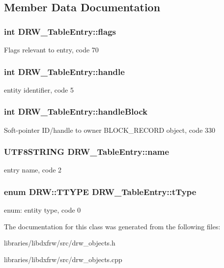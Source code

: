 \subsection{Member Data Documentation}
\hypertarget{classDRW__TableEntry_a45931e761e264e52857687067029e6a8}{
\subsubsection[{flags}]{\setlength{\rightskip}{0pt plus 5cm}int D\-R\-W\-\_\-\-Table\-Entry\-::flags}}\label{classDRW__TableEntry_a45931e761e264e52857687067029e6a8}
Flags relevant to entry, code 70 \hypertarget{classDRW__TableEntry_a9aefd859bd8a3d423f53623f8f089ac3}{
\subsubsection[{handle}]{\setlength{\rightskip}{0pt plus 5cm}int D\-R\-W\-\_\-\-Table\-Entry\-::handle}}\label{classDRW__TableEntry_a9aefd859bd8a3d423f53623f8f089ac3}
entity identifier, code 5 \hypertarget{classDRW__TableEntry_a91713970d0eec5baf8aa16b8c5556ce7}{
\subsubsection[{handle\-Block}]{\setlength{\rightskip}{0pt plus 5cm}int D\-R\-W\-\_\-\-Table\-Entry\-::handle\-Block}}\label{classDRW__TableEntry_a91713970d0eec5baf8aa16b8c5556ce7}
Soft-\/pointer I\-D/handle to owner B\-L\-O\-C\-K\-\_\-\-R\-E\-C\-O\-R\-D object, code 330 \hypertarget{classDRW__TableEntry_a854ab48893457e607ac13425304415b4}{
\subsubsection[{name}]{\setlength{\rightskip}{0pt plus 5cm}U\-T\-F8\-S\-T\-R\-I\-N\-G D\-R\-W\-\_\-\-Table\-Entry\-::name}}\label{classDRW__TableEntry_a854ab48893457e607ac13425304415b4}
entry name, code 2 \hypertarget{classDRW__TableEntry_a4ceb84db2231dcc1c3070e5825966a0d}{
\subsubsection[{t\-Type}]{\setlength{\rightskip}{0pt plus 5cm}enum D\-R\-W\-::\-T\-T\-Y\-P\-E D\-R\-W\-\_\-\-Table\-Entry\-::t\-Type}}\label{classDRW__TableEntry_a4ceb84db2231dcc1c3070e5825966a0d}
enum\-: entity type, code 0 

The documentation for this class was generated from the following files\-:\begin{DoxyCompactItemize}
\item 
libraries/libdxfrw/src/drw\-\_\-objects.\-h\item 
libraries/libdxfrw/src/drw\-\_\-objects.\-cpp\end{DoxyCompactItemize}
